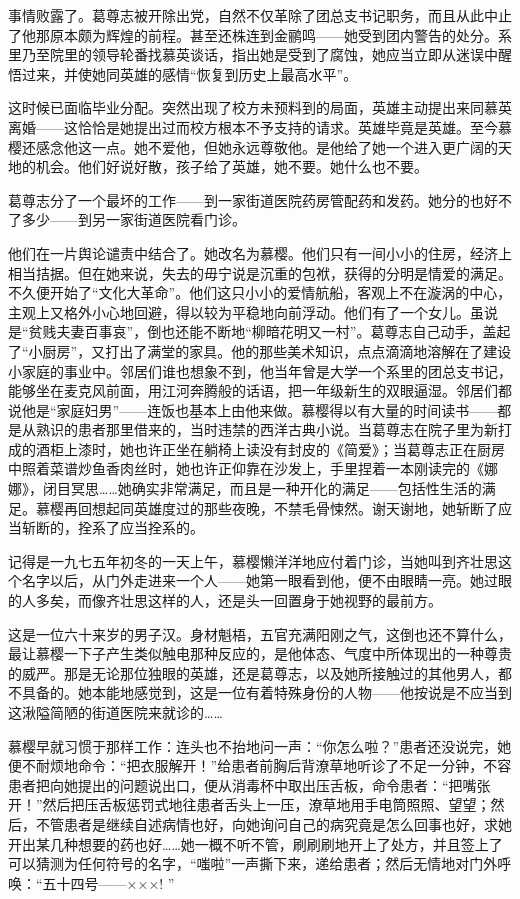 \par 事情败露了。葛尊志被开除出党，自然不仅革除了团总支书记职务，而且从此中止了他那原本颇为辉煌的前程。甚至还株连到金鹂鸣——她受到团内警告的处分。系里乃至院里的领导轮番找慕英谈话，指出她是受到了腐蚀，她应当立即从迷误中醒悟过来，并使她同英雄的感情“恢复到历史上最高水平”。
\par 这时候已面临毕业分配。突然出现了校方未预料到的局面，英雄主动提出来同慕英离婚——这恰恰是她提出过而校方根本不予支持的请求。英雄毕竟是英雄。至今慕樱还感念他这一点。她不爱他，但她永远尊敬他。是他给了她一个进入更广阔的天地的机会。他们好说好散，孩子给了英雄，她不要。她什么也不要。
\par 葛尊志分了一个最坏的工作——到一家街道医院药房管配药和发药。她分的也好不了多少——到另一家街道医院看门诊。
\par 他们在一片舆论谴责中结合了。她改名为慕樱。他们只有一间小小的住房，经济上相当拮据。但在她来说，失去的毋宁说是沉重的包袱，获得的分明是情爱的满足。不久便开始了“文化大革命”。他们这只小小的爱情航船，客观上不在漩涡的中心，主观上又格外小心地回避，得以较为平稳地向前浮动。他们有了一个女儿。虽说是“贫贱夫妻百事哀”，倒也还能不断地“柳暗花明又一村”。葛尊志自己动手，盖起了“小厨房”，又打出了满堂的家具。他的那些美术知识，点点滴滴地溶解在了建设小家庭的事业中。邻居们谁也想象不到，他当年曾是大学一个系里的团总支书记，能够坐在麦克风前面，用江河奔腾般的话语，把一年级新生的双眼逼湿。邻居们都说他是“家庭妇男”——连饭也基本上由他来做。慕樱得以有大量的时间读书——都是从熟识的患者那里借来的，当时违禁的西洋古典小说。当葛尊志在院子里为新打成的酒柜上漆时，她也许正坐在躺椅上读没有封皮的《简爱》；当葛尊志正在厨房中照着菜谱炒鱼香肉丝时，她也许正仰靠在沙发上，手里捏着一本刚读完的《娜娜》，闭目冥思……她确实非常满足，而且是一种开化的满足——包括性生活的满足。慕樱再回想起同英雄度过的那些夜晚，不禁毛骨悚然。谢天谢地，她斩断了应当斩断的，拴系了应当拴系的。
\par 记得是一九七五年初冬的一天上午，慕樱懒洋洋地应付着门诊，当她叫到齐壮思这个名字以后，从门外走进来一个人——她第一眼看到他，便不由眼睛一亮。她过眼的人多矣，而像齐壮思这样的人，还是头一回置身于她视野的最前方。
\par 这是一位六十来岁的男子汉。身材魁梧，五官充满阳刚之气，这倒也还不算什么，最让慕樱一下子产生类似触电那种反应的，是他体态、气度中所体现出的一种尊贵的威严。那是无论那位独眼的英雄，还是葛尊志，以及她所接触过的其他男人，都不具备的。她本能地感觉到，这是一位有着特殊身份的人物——他按说是不应当到这湫隘简陋的街道医院来就诊的……
\par 慕樱早就习惯于那样工作：连头也不抬地问一声：“你怎么啦？”患者还没说完，她便不耐烦地命令：“把衣服解开！”给患者前胸后背潦草地听诊了不足一分钟，不容患者把向她提出的问题说出口，便从消毒杯中取出压舌板，命令患者：“把嘴张开！”然后把压舌板惩罚式地往患者舌头上一压，潦草地用手电筒照照、望望；然后，不管患者是继续自述病情也好，向她询问自己的病究竟是怎么回事也好，求她开出某几种想要的药也好……她一概不听不管，刷刷刷地开上了处方，并且签上了可以猜测为任何符号的名字，“嗤啦”一声撕下来，递给患者；然后无情地对门外呼唤：“五十四号——×××! ”
